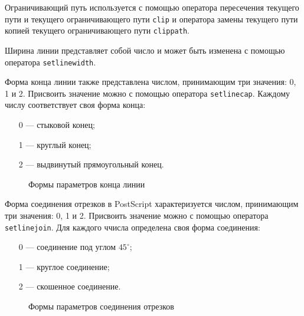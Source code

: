 Ограничивающий путь используется с помощью оператора пересечения текущего пути и текущего ограничивающего пути \texttt{clip} и оператора замены текущего пути копией текущего ограничивающего пути \texttt{clippath}.

Ширина линии представляет собой число и может быть изменена с помощью оператора \texttt{setlinewidth}.

Форма конца линии также представлена числом, принимающим три значения: 0, 1 и 2. Присвоить значение можно с помощью оператора \texttt{setlinecap}. Каждому числу соответствует своя форма конца:
\begin{itemize}
\item [0 ---] стыковой конец;
\item [1 ---] круглый конец;
\item [2 ---] выдвинутый прямоугольный конец.
\end{itemize} 

\begin{figure}[t]
\caption{Формы параметров конца линии}\label{pic_linecap}
\end{figure}

Форма соединения отрезков в PostScript характеризуется числом, принимающим три значения: 0, 1 и 2. Присвоить значение можно с помощью оператора \texttt{setlinejoin}. Для каждого ччисла определена своя форма соединения:
\begin{itemize}
\item [0 ---] соединение под углом $45^{\circ} $;
\item [1 ---] круглое соединение;
\item [2 ---] скошенное соединение.
\end{itemize} 

\begin{figure}[t]
\caption{Формы параметров соединения отрезков}\label{pic_linejoin}
\end{figure}


